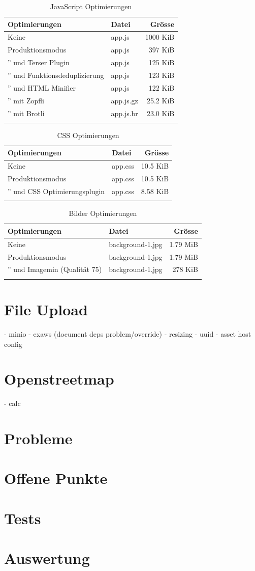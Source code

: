 \begin{longtable}[]{@{}llr@{}}
  \toprule
  \textbf{Optimierungen} & \textbf{Datei} & \textbf{Grösse}\tabularnewline
  \midrule
  Keine & app.js & 1000 KiB\tabularnewline
  Produktionsmodus & app.js & 397 KiB\tabularnewline
  ” und Terser Plugin & app.js & 125 KiB\tabularnewline
  ” und Funktionsdeduplizierung & app.js & 123 KiB\tabularnewline
  ” und HTML Minifier & app.js & 122 KiB\tabularnewline
  ” mit Zopfli & app.js.gz & 25.2 KiB\tabularnewline
  ” mit Brotli & app.js.br & 23.0 KiB\tabularnewline
  \bottomrule
  \caption{JavaScript Optimierungen}
\end{longtable}

\begin{longtable}[]{@{}llr@{}}
  \toprule
  \textbf{Optimierungen} & \textbf{Datei} & \textbf{Grösse}\tabularnewline
  \midrule
  Keine & app.css & 10.5 KiB\tabularnewline
  Produktionsmodus & app.css & 10.5 KiB\tabularnewline
  ” und CSS Optimierungsplugin & app.css & 8.58 KiB\tabularnewline
  \bottomrule
  \caption{CSS Optimierungen}
\end{longtable}

\begin{longtable}[]{@{}llr@{}}
  \toprule
  \textbf{Optimierungen} & \textbf{Datei} & \textbf{Grösse}\tabularnewline
  \midrule
  Keine & background-1.jpg & 1.79 MiB\tabularnewline
  Produktionsmodus & background-1.jpg & 1.79 MiB\tabularnewline
  ” und Imagemin (Qualität 75) & background-1.jpg & 278 KiB\tabularnewline
  \bottomrule
  \caption{Bilder Optimierungen}
\end{longtable}

\clearpage
\section{File Upload}

- minio
- exaws (document deps problem/override)
- resizing
- uuid
- asset host config

\section{Openstreetmap}

- calc

\clearpage
\section{Probleme}

\clearpage
\section{Offene Punkte}

\clearpage
\section{Tests}

\section{Auswertung}
